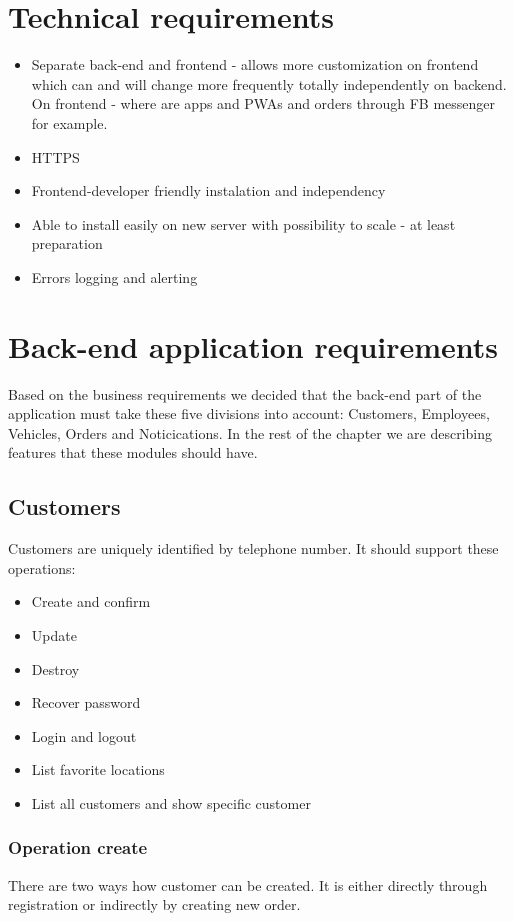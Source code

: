 \section{Technical requirements}
\begin{itemize}
	\item Separate back-end and frontend - allows more customization on frontend which can and will change more frequently totally independently on backend. On frontend - where are apps and PWAs and orders through FB messenger for example.
	\item HTTPS
	\item Frontend-developer friendly instalation and independency
	\item Able to install easily on new server with possibility to scale - at least preparation
	\item Errors logging and alerting
\end{itemize}
\section{Back-end application requirements}

Based on the business requirements we decided that the back-end part of the application must take these five divisions into account: Customers, Employees, Vehicles, Orders and Noticications. In the rest of the chapter we are describing features that these modules should have.
\subsection{Customers}
Customers are uniquely identified by telephone number. It should support these operations:
\begin{itemize}
	\item Create and confirm
	\item Update
	\item Destroy
	\item Recover password
	\item Login and logout
	\item List favorite locations
	\item List all customers and show specific customer
\end{itemize}
\subsubsection{Operation create}
There are two ways how customer can be created. It is either directly through registration or indirectly by creating new order.

